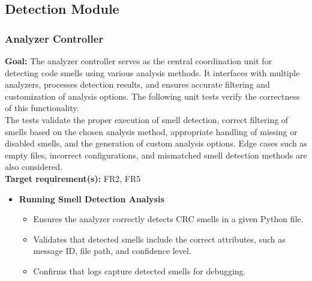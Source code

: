 \documentclass[12pt, titlepage]{article}
\begin{document}
\begin{enumerate}[label={\bf \textcolor{Maroon}{test-SRT-\arabic*}}, wide=0pt, font=\itshape]



\subsection{Detection Module}

\subsubsection{Analyzer Controller}

\textbf{Goal:} The analyzer controller serves as the central coordination unit for detecting code smells using various analysis methods. It interfaces with multiple analyzers, processes detection results, and ensures accurate filtering and customization of analysis options. The following unit tests verify the correctness of this functionality.\\

\noindent The tests validate the proper execution of smell detection, correct filtering of smells based on the chosen analysis method, appropriate handling of missing or disabled smells, and the generation of custom analysis options. Edge cases such as empty files, incorrect configurations, and mismatched smell detection methods are also considered.\\

\noindent\textbf{Target requirement(s):} FR2, FR5~\cite{SRS} \\

\begin{itemize}
    \item \textbf{Running Smell Detection Analysis}
    \begin{itemize}
        \item Ensures the analyzer correctly detects CRC smells in a given Python file.
        \item Validates that detected smells include the correct attributes, such as message ID, file path, and confidence level.
        \item Confirms that logs capture detected smells for debugging.
    \end{itemize}


\end{itemize}
\end{enumerate}
\end{document}
